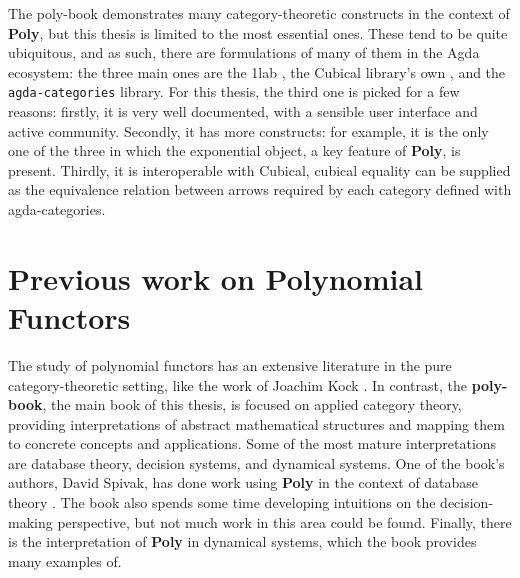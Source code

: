 The poly-book demonstrates many category-theoretic constructs in the context of \textbf{Poly}, but this thesis is limited to the most essential ones. These tend to be quite ubiquitous, and as such, there are formulations of many of them in the Agda ecosystem: the three main ones are the 1lab \cite{1lab}, the Cubical library's own \cite{cubical-cat}, and the \texttt{agda-categories} \cite{agda-cats} library. For this thesis, the third one is picked for a few reasons: firstly, it is very well documented, with a sensible user interface and active community. Secondly, it has more constructs: for example, it is the only one of the three in which the exponential object, a key feature of \textbf{Poly}, is present. Thirdly, it is interoperable with Cubical, cubical equality can be supplied as the equivalence relation between arrows required by each category defined with agda-categories. %

\section{Previous work on Polynomial Functors}

The study of polynomial functors has an extensive literature in the pure category-theoretic setting, like the work of Joachim Kock \cite{kockpoly} \cite{kock2009polynomial}. In contrast, the \textbf{poly-book}, the main book of this thesis, is focused on applied category theory, providing interpretations of abstract mathematical structures and mapping them to concrete concepts and applications. Some of the most mature interpretations are database theory, decision systems, and dynamical systems. One of the book's authors, David Spivak, has done work using \textbf{Poly} in the context of database theory \cite{spivak2023functorial}. The book also spends some time developing intuitions on the decision-making perspective, but not much work in this area could be found. Finally, there is the interpretation of \textbf{Poly} in dynamical systems, which the book provides many examples of.

